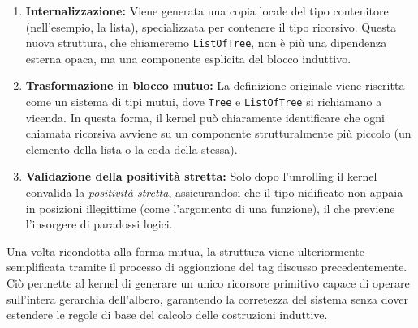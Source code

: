 \begin{enumerate}
    \item \textbf{Internalizzazione:} 
        Viene generata una copia locale del tipo contenitore (nell'esempio, la lista), specializzata per contenere il tipo ricorsivo. Questa nuova struttura, 
        che chiameremo \texttt{ListOfTree}, non è più una dipendenza esterna opaca, ma una componente esplicita del blocco induttivo.
    \item \textbf{Trasformazione in blocco mutuo:} 
        La definizione originale viene riscritta come un sistema di tipi mutui, dove \texttt{Tree} e \texttt{ListOfTree} si richiamano a vicenda. In questa 
        forma, il kernel può chiaramente identificare che ogni chiamata ricorsiva avviene su un componente strutturalmente più piccolo (un elemento della lista 
        o la coda della stessa).
    \item \textbf{Validazione della positività stretta:} 
        Solo dopo l'unrolling il kernel convalida la \textit{positività stretta}, assicurandosi che il tipo nidificato non appaia in posizioni illegittime 
        (come l'argomento di una funzione), il che previene l'insorgere di paradossi logici.
\end{enumerate}
Una volta ricondotta alla forma mutua, la struttura viene ulteriormente semplificata tramite il processo di aggionzione del tag discusso precedentemente. Ciò permette 
al kernel di generare un unico ricorsore primitivo capace di operare sull'intera gerarchia dell'albero, garantendo la corretezza del sistema senza dover estendere le 
regole di base del calcolo delle costruzioni induttive.

